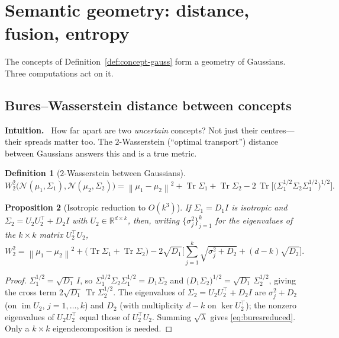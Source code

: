 \documentclass[11pt]{article}
\theoremstyle{definition}
\newtheorem{definition}{Definition}[section]
\theoremstyle{plain}
\newtheorem{proposition}[definition]{Proposition}
\theoremstyle{remark}
\newcommand{\Intu}{\noindent\textbf{\color{intuitioncol}Intuition.}\ }
\newcommand{\R}{\mathbb{R}}
\newcommand{\Tr}{\operatorname{Tr}}
\newcommand{\im}{\operatorname{im}}
\newcommand{\norm}[1]{\left\lVert #1 \right\rVert}
\begin{document}
\section{Semantic geometry: distance, fusion, entropy}\label{sec:semantic}

The concepts of Definition~\ref{def:concept-gauss} form a geometry of Gaussians. Three
computations act on it.

\subsection{Bures--Wasserstein distance between concepts}

\begin{intu}\Intu
How far apart are two \emph{uncertain} concepts? Not just their centres---their
spreads matter too. The $2$-Wasserstein (``optimal transport'') distance between
Gaussians answers this and is a true metric.
\end{intu}

\begin{definition}[$2$-Wasserstein between Gaussians]
\begin{equation}\label{eq:bures}
W_2^2\big(\mathcal N(\mu_1,\Sigma_1),\mathcal N(\mu_2,\Sigma_2)\big)
=\norm{\mu_1-\mu_2}^2+\Tr\Sigma_1+\Tr\Sigma_2
-2\,\Tr\!\Big[\big(\Sigma_1^{1/2}\Sigma_2\Sigma_1^{1/2}\big)^{1/2}\Big].
\end{equation}
\end{definition}

\begin{proposition}[Isotropic reduction to $O(k^3)$]\label{prop:buresiso}
If $\Sigma_1=D_1 I$ is isotropic and $\Sigma_2=U_2U_2^\top+D_2 I$ with
$U_2\in\R^{d\times k}$, then, writing $\{\sigma_j^2\}_{j=1}^k$ for the eigenvalues of
the $k\times k$ matrix $U_2^\top U_2$,
\begin{equation}\label{eq:buresreduced}
W_2^2=\norm{\mu_1-\mu_2}^2+\big(\Tr\Sigma_1+\Tr\Sigma_2\big)
-2\sqrt{D_1}\Big[\textstyle\sum_{j=1}^k\sqrt{\sigma_j^2+D_2}+(d-k)\sqrt{D_2}\Big].
\end{equation}
\end{proposition}
\begin{proof}
$\Sigma_1^{1/2}=\sqrt{D_1}\,I$, so
$\Sigma_1^{1/2}\Sigma_2\Sigma_1^{1/2}=D_1\Sigma_2$ and
$\big(D_1\Sigma_2\big)^{1/2}=\sqrt{D_1}\,\Sigma_2^{1/2}$, giving the cross term
$2\sqrt{D_1}\,\Tr\Sigma_2^{1/2}$. The eigenvalues of $\Sigma_2=U_2U_2^\top+D_2I$ are
$\sigma_j^2+D_2$ (on $\im U_2$, $j=1,\dots,k$) and $D_2$ (with multiplicity $d-k$ on
$\ker U_2^\top$); the nonzero eigenvalues of $U_2U_2^\top$ equal those of $U_2^\top
U_2$. Summing $\sqrt{\lambda}$ gives \eqref{eq:buresreduced}. Only a $k\times k$
eigendecomposition is needed.
\end{proof}
\end{document}
